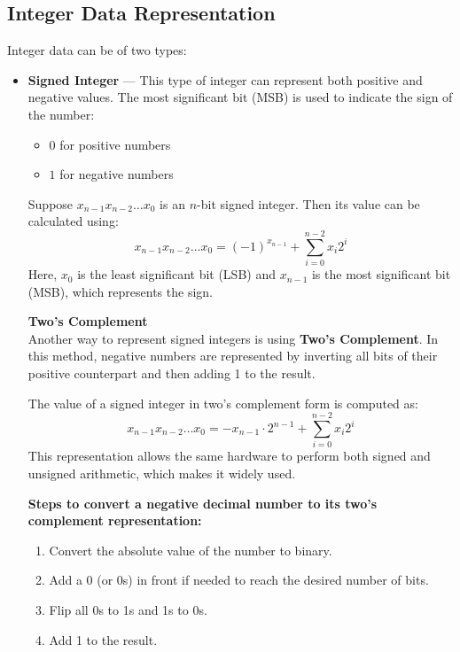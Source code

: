 \documentclass[12pt]{book}
\begin{document}
\subsection{Integer Data Representation} \label{subsec:integer-data}

Integer data can be of two types:
\begin{itemize}
    \item \textbf{Signed Integer} — This type of integer can represent both positive and negative values. The most significant bit (MSB) is used to indicate the sign of the number:
    \begin{itemize}
        \item $0$ for positive numbers
        \item $1$ for negative numbers
    \end{itemize}
    
    Suppose $x_{n-1}x_{n-2}\ldots x_0$ is an $n$-bit signed integer. Then its value can be calculated using:
    \begin{equation} \label{eq:signed-magnitude}
        x_{n-1}x_{n-2}\ldots x_0 = (-1)^{x_{n-1}} + \sum_{i=0}^{n-2} x_i 2^i
    \end{equation}
    Here, $x_0$ is the least significant bit (LSB) and $x_{n-1}$ is the most significant bit (MSB), which represents the sign.

    \medskip
    \textbf{Two's Complement}\\
    Another way to represent signed integers is using \textbf{Two's Complement}. In this method, negative numbers are represented by inverting all bits of their positive counterpart and then adding 1 to the result.

    The value of a signed integer in two's complement form is computed as:
    \begin{equation} \label{eq:twos-complement}
        x_{n-1}x_{n-2}\ldots x_0 = -x_{n-1} \cdot 2^{n-1} + \sum_{i=0}^{n-2} x_i 2^i
    \end{equation}
    This representation allows the same hardware to perform both signed and unsigned arithmetic, which makes it widely used.

    \begin{example}
        \textbf{Steps to convert a negative decimal number to its two's complement representation:}
        \begin{enumerate}
            \item Convert the absolute value of the number to binary.
            \item Add a 0 (or 0s) in front if needed to reach the desired number of bits.
            \item Flip all 0s to 1s and 1s to 0s.
            \item Add 1 to the result.
        \end{enumerate}


\end{example}
\end{itemize}
\end{document}
